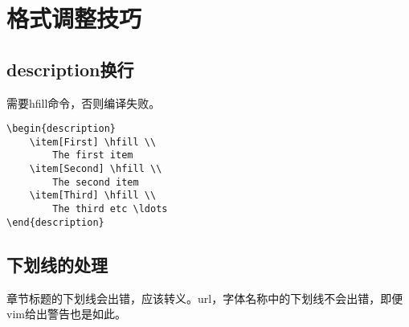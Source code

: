 \section{格式调整技巧}
\subsection{description换行}
需要hfill命令，否则编译失败。
\begin{verbatim}
\begin{description}
    \item[First] \hfill \\
        The first item
    \item[Second] \hfill \\
        The second item
    \item[Third] \hfill \\
        The third etc \ldots
\end{description}
\end{verbatim}

\subsection{下划线的处理}
章节标题的下划线会出错，应该转义。url，字体名称中的下划线不会出错，即便vim给出警告也是如此。
